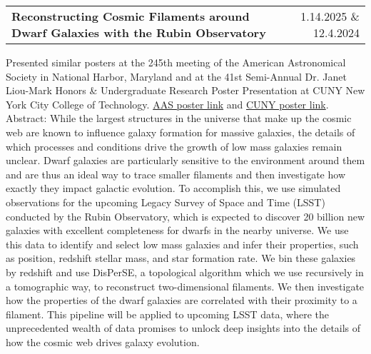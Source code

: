 \documentclass[a4paper,12pt]{article}
\makeatletter
\newenvironment{jobshort}[2]
    {
    \begin{tabularx}{\linewidth}{@{}X r@{}}
    {\raggedright\arraybackslash\nohyphens{#1}} & #2 \\[3.75pt]
    \end{tabularx}
    }
    {}
\makeatother
\begin{document}
\begin{jobshort}{\textbf{Reconstructing Cosmic Filaments around Dwarf Galaxies with the Rubin Observatory}}{1.14.2025 \& 12.4.2024}
Presented similar posters at the 245th meeting of the American Astronomical Society in National Harbor, Maryland and at the 41st Semi-Annual Dr. Janet Liou-Mark Honors \& Undergraduate Research Poster Presentation at CUNY New York City College of Technology. \href{https://aas245-aas.ipostersessions.com/Default.aspx?s=3B-03-9F-6A-6E-75-01-97-E0-FC-B1-F5-ED-BF-AB-40}{AAS poster link} and \href{https://academicworks.cuny.edu/ny_pubs/1222/}{CUNY poster link}. Abstract: While the largest structures in the universe that make up the cosmic web are known to influence galaxy formation for massive galaxies, the details of which processes and conditions drive the growth of low mass galaxies remain unclear. Dwarf galaxies are particularly sensitive to the environment around them and are thus an ideal way to trace smaller filaments and then investigate how exactly they impact galactic evolution. To accomplish this, we use simulated observations for the upcoming Legacy Survey of Space and Time (LSST) conducted by the Rubin Observatory, which is expected to discover 20 billion new galaxies with excellent completeness for dwarfs in the nearby universe. We use this data to identify and select low mass galaxies and infer their properties, such as position, redshift stellar mass, and star formation rate. We bin these galaxies by redshift and use DisPerSE, a topological algorithm which we use recursively in a tomographic way, to reconstruct two-dimensional filaments. We then investigate how the properties of the dwarf galaxies are correlated with their proximity to a filament. This pipeline will be applied to upcoming LSST data, where the unprecedented wealth of data promises to unlock deep insights into the details of how the cosmic web drives galaxy evolution.
\end{jobshort}
\end{document}
